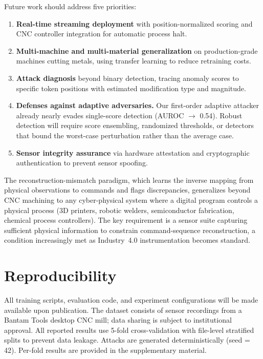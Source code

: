 Future work should address five priorities:
\begin{enumerate}
    \item \textbf{Real-time streaming deployment} with position-normalized scoring and CNC controller integration for automatic process halt.
    \item \textbf{Multi-machine and multi-material generalization} on production-grade machines cutting metals, using transfer learning to reduce retraining costs.
    \item \textbf{Attack diagnosis} beyond binary detection, tracing anomaly scores to specific token positions with estimated modification type and magnitude.
    \item \textbf{Defenses against adaptive adversaries.} Our first-order adaptive attacker already nearly evades single-score detection (AUROC $\to$ 0.54). Robust detection will require score ensembling, randomized thresholds, or detectors that bound the worst-case perturbation rather than the average case.
    \item \textbf{Sensor integrity assurance} via hardware attestation and cryptographic authentication to prevent sensor spoofing.
\end{enumerate}

The reconstruction-mismatch paradigm, which learns the inverse mapping from physical observations to commands and flags discrepancies, generalizes beyond CNC machining to any cyber-physical system where a digital program controls a physical process (3D printers, robotic welders, semiconductor fabrication, chemical process controllers).
The key requirement is a sensor suite capturing sufficient physical information to constrain command-sequence reconstruction, a condition increasingly met as Industry~4.0 instrumentation becomes standard.

\section*{Reproducibility}
All training scripts, evaluation code, and experiment configurations will be made available upon publication.
The dataset consists of sensor recordings from a Bantam Tools desktop CNC mill; data sharing is subject to institutional approval.
All reported results use 5-fold cross-validation with file-level stratified splits to prevent data leakage.
Attacks are generated deterministically (seed = 42).
Per-fold results are provided in the supplementary material.
